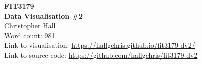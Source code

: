 \documentclass[12pt,letterpaper]{article}
\newcommand\course{FIT3179}
\newcommand\hwtitle{Data Visualisation \#2}
\newcommand\nameIDa{Christopher Hall}
\begin{document}
\begin{titlepage}

    \begin{center}
        \textbf{\LARGE \course} \\
        \vspace{1cm}
        \textbf{\LARGE \hwtitle} \\
        \vspace{3cm}
        \nameIDa \\
        \vspace{3cm}
        Word count: 981 \\
        Link to visualisation: \href{https://hallgchris.github.io/fit3179-dv2}{https://hallgchris.github.io/fit3179-dv2/} \\
        Link to source code: \href{https://github.com/hallgchris/fit3179-dv2}{https://github.com/hallgchris/fit3179-dv2}
    \end{center}

\end{titlepage}
\end{document}
